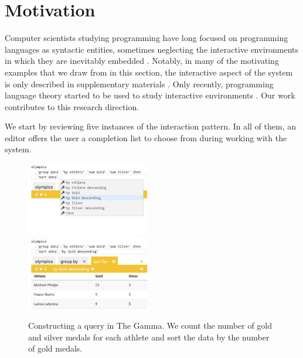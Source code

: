 \documentclass[ a4paper,UKenglish,cleveref, autoref, thm-restate]{lipics-v2021}
\begin{document}

\section{Motivation}
\label{sec:motivation}

Computer scientists studying programming have long focused on programming languages as syntactic
entities, sometimes neglecting the interactive environments in which they are inevitably
embedded \cite{rpg-2012-revolution}. Notably, in many of the motivating examples that we draw
from in this section, the interactive aspect of the system is only described in supplementary
materials \cite{brady-2015-idris,syme-2013-inforich,altenkirch-1994-alf}. Only recently, programming
language theory started to be used to study interactive environments
\cite{adams-2025-grove,mayer-2018-bidirectional}. Our work contributes to this research direction.

We start by reviewing five instances of the interaction pattern. In all of them, an editor
offers the user a completion list to choose from during working with the system.

\begin{figure}[t]
\vspace{-0.5em}
\includegraphics[width=0.48\textwidth]{fig/thegamma1.png}~~
\includegraphics[width=0.48\textwidth]{fig/thegamma2.png}
\caption{Constructing a query in The Gamma. We count the number of gold and silver medals for
each athlete and sort the data by the number of gold medals.}
\vspace{-0.5em}
\label{fig:thegamma}
\end{figure}
\end{document}

